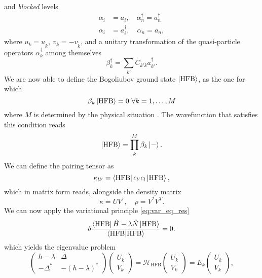 and \textit{blocked} levels
\begin{align}
\alpha_i &= a_i,\quad \alpha_n^\dagger = a_n^\dagger
\\\alpha_i &= a_i^\dagger, \quad \alpha_n = a_n,
\end{align}
where $u_k=u_{\tilde k},\ v_k=-v_{\tilde k}$, and a unitary transformation of the quasi-particle operators $\alpha_k^\dagger$ among themselves
\begin{equation}
    \beta_k^ \dagger = \sum_{k'}C_{k'k}a_{k'}^\dagger.
\end{equation}
We are now able to define the Bogoliubov ground state $\ket{\text{HFB}}$, as the one for which
\begin{equation}
    \beta_k \ket{\text{HFB}} = 0 \ \forall k = 1,\ldots,M
\end{equation}
where $M$ is determined by the physical situation \cite{ring2004nuclear}.
The wavefunction that satisfies this condition reads
\begin{equation}
\ket{\text{HFB}}=\prod_k^M\beta_k \ket{-}.
\end{equation}
We can define the pairing tensor as
\begin{equation}
    \kappa_{ll'} = \bra{\text{HFB}}c_{l'}c_l\ket{\text{HFB}},
\end{equation}
which in matrix form reads, alongside the density matrix
\begin{equation}
    \kappa = UV^\dagger,\quad \rho = V^*V^T.
\end{equation}
We can now apply the variational principle \eqref{eq:var_eq_res}
\begin{equation}
    \label{eq:varhfb}
    \delta \frac{\bra{\text{HFB}} \hat H-\lambda \hat N\ket{\text{HFB}}}{\bra{\text{HFB}}\ket{\text{HFB}}} = 0.
\end{equation}
which yields the eigenvalue problem
\begin{equation}
    \label{eq:eighfb}
    \begin{pmatrix}
    h -\lambda& \Delta \\ -\Delta^* & -(h-\lambda)^*
    \end{pmatrix}
    \begin{pmatrix}
        U_k \\ V_k
    \end{pmatrix}
    =\mathcal H_\text{HFB}\begin{pmatrix}U_k \\V_k\end{pmatrix}= E_k \begin{pmatrix}
        U_k \\ V_k
    \end{pmatrix},
\end{equation}

